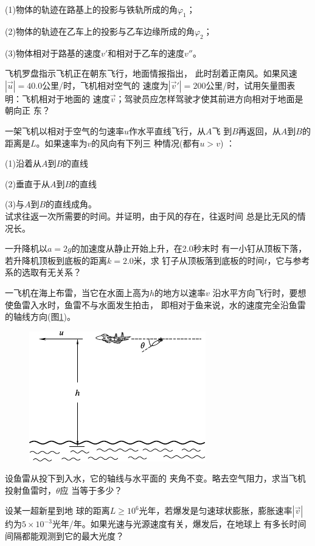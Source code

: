 \begin{exercises}
(1)物体的轨迹在路基上的投影与铁轨所成的角$ \varphi _1 $；

(2)物体的轨迹在乙车上的投影与乙车边缘所成的角$ \varphi _2 $；

(3)物体相对于路基的速度$ v' $和相对于乙车的速度$ v'' $。

\exercise 飞机罗盘指示飞机正在朝东飞行，地面情报指出，
此时刮着正南风。如果风速$ | \vec{u} | = 4 0 . 0 $公里/时，飞机相对空气的
速度为$ | \vec{v} ' | = 2 0 0 $公里/时，试用矢量图表明：飞机相对于地面的
速度$\vec{v}$；驾驶员应怎样驾驶才使其前进方向相对于地面是朝向正
东？

\exercise 一架飞机以相对于空气的匀速率$u$作水平直线飞行，从$A$飞
到$B$再返回，从$A$到$B$的距离是$L$。如果速率为$v$的风向有下列三
种情况(都有$ u > v$) ：

(1)沿着从$A$到$B$的直线

(2)垂直于从$A$到$B$的直线

(3)与$A$到$B$的直线成角。\\
试求往返一次所需要的时间。并证明，由于风的存在，往返时间
总是比无风的情况长。

\exercise 一升降机以$ a = 2 g $的加速度从静止开始上升，在2.0秒末时
有一小钉从顶板下落，若升降机顶板到底板的距离$ k = 2 . 0 $米，求
钉子从顶板落到底板的时间$t$，它与参考系的选取有无关系？

\exercise 一飞机在海上布雷，当它在水面上高为$h$的地方以速率$v$
沿水平方向飞行时，要想使鱼雷入水时，鱼雷不与水面发生拍击，
即相对于鱼来说，水的速度完全沿鱼雷的轴线方向(图\ref{fig:02.18})。
\begin{figure}
  \includegraphics{figure/fig02.18}
  \caption{}
  \label{fig:02.18}
\end{figure}
设鱼雷从投下到入水，它的轴线与水平面的
夹角不变。略去空气阻力，求当飞机投射鱼雷时，$\theta$应
当等于多少？

\exercise 设某一超新星到地
球的距离$ L \geqslant 1 0 ^ { 6 } $光年，若爆发是匀速球状膨胀，膨胀速率$|\vec{v}|$约为$5 \times 1 0 ^ { - 3 } $光年/年。如果光速与光源速度有关，爆发后，在地球上
有多长时间间隔都能观测到它的最大光度？


\end{exercises}
